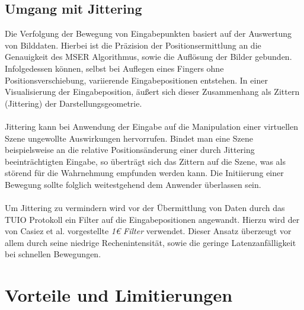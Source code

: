 \subsection{Umgang mit Jittering}
\label{subsec:umgang_mit_jittering}

Die Verfolgung der Bewegung von Eingabepunkten basiert auf der Auswertung von Bilddaten. Hierbei ist die Präzision der Positionsermittlung an die Genauigkeit des MSER Algorithmus, sowie die Auflösung der Bilder gebunden. Infolgedessen können, selbst bei Auflegen eines Fingers ohne Positionsverschiebung, variierende Eingabepositionen entstehen. In einer Visualisierung der Eingabeposition, äußert sich dieser Zusammenhang als Zittern (Jittering) der Darstellungsgeometrie.
\\\\
Jittering kann bei Anwendung der Eingabe auf die Manipulation einer virtuellen Szene ungewollte Auswirkungen hervorrufen. Bindet man eine Szene beispielsweise an die relative Positionsänderung einer durch Jittering beeinträchtigten Eingabe, so überträgt sich das Zittern auf die Szene, was als störend für die Wahrnehmung empfunden werden kann. Die Initiierung einer Bewegung sollte folglich weitestgehend dem Anwender überlassen sein.
\\\\ 
Um Jittering zu vermindern wird vor der Übermittlung von Daten durch das TUIO Protokoll ein Filter auf die Eingabepositionen angewandt. Hierzu wird der von Casiez et al. vorgestellte \emph{1\euro{} Filter} verwendet. Dieser Ansatz überzeugt vor allem durch seine niedrige Rechenintensität, sowie die geringe Latenzanfälligkeit bei schnellen Bewegungen.


\section{Vorteile und Limitierungen}
\label{sec:diskussion_mser}


